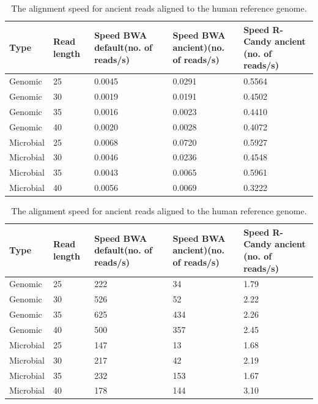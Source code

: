 \documentclass[11pt,a4paper]{report}
\begin{document}
\begin{table}[H]
 \begin{tabular}{ |  p{2cm} | p{2cm} | p{2cm} | p{2cm} |p{2cm} | }
  \hline
  	\textbf{Type} & \textbf{Read length }&\textbf{Speed BWA 
  	default\hspace{35pt}(no. of reads/s) } 	 
  	&\textbf{Speed BWA ancient)\hspace{35pt}(no. of reads/s)} 
  	& \textbf{Speed R-Candy ancient \hspace{35pt}(no. of reads/s)}\\ \hline
 	  Genomic    & 25  & 0.0045 &  0.0291   &  0.5564 \\ \hline
      Genomic    & 30  & 0.0019 &  0.0191   &  0.4502 \\ \hline
      Genomic    & 35  & 0.0016 &  0.0023   &  0.4410 \\ \hline
 	  Genomic	 & 40  & 0.0020 &  0.0028   &  0.4072 \\ \hline
 	  Microbial  & 25  & 0.0068 &  0.0720   &  0.5927 \\ \hline
      Microbial  & 30  & 0.0046 &  0.0236   &  0.4548 \\ \hline
 	  Microbial  & 35  & 0.0043 &  0.0065   &  0.5961 \\ \hline
 	  Microbial  & 40  & 0.0056 &  0.0069   &  0.3222 \\ \hline
   \end{tabular}
\caption{The alignment speed for ancient reads aligned to 
the human reference genome.}
\label{speed-RG}
\end{table}

\begin{table}[H]
  \begin{tabular}{ |  p{2cm} | p{2cm} | p{2cm} | p{2cm} |p{2cm} | }
    \hline
  	\textbf{Type} & \textbf{Read length }&\textbf{Speed BWA 
  	default\hspace{35pt}(no. of reads/s) } 	 
  	&\textbf{Speed BWA ancient)\hspace{35pt}(no. of reads/s)} 
  	& \textbf{Speed R-Candy ancient \hspace{35pt}(no. of reads/s)}\\ \hline
 	  Genomic    & 25  & 222 &  34   &  1.79 \\ \hline
      Genomic    & 30  & 526 &  52   &  2.22 \\ \hline
      Genomic    & 35  & 625 &  434   &  2.26 \\ \hline
 	  Genomic	 & 40  & 500 &  357   &  2.45 \\ \hline
 	  Microbial  & 25  & 147 &  13   &  1.68 \\ \hline
      Microbial  & 30  & 217 &  42   &  2.19 \\ \hline
 	  Microbial  & 35  & 232 &  153   &  1.67 \\ \hline
 	  Microbial  & 40  & 178 &  144   &  3.10 \\ \hline
   \end{tabular}
\caption{The alignment speed for ancient reads aligned to 
the human reference genome.}
\label{speed-RG}
\end{table}
\end{document}
